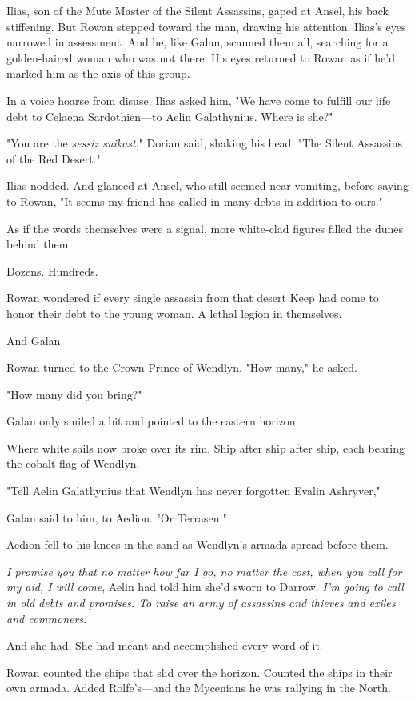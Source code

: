 Ilias, son of the Mute Master of the Silent Assassins, gaped at Ansel, his back stiffening.
But Rowan stepped toward the man, drawing his attention.
Ilias's eyes narrowed in assessment.
And he, like Galan, scanned them all, searching for a golden-haired woman who was not there.
His eyes returned to Rowan as if he'd marked him as the axis of this group.

In a voice hoarse from disuse, Ilias asked him, "We have come to fulfill our life debt to Celaena Sardothien---to Aelin Galathynius.
Where is she?"

"You are the \emph{sessiz suikast}," Dorian said, shaking his head.
"The Silent Assassins of the Red Desert."

Ilias nodded.
And glanced at Ansel, who still seemed near vomiting, before saying to Rowan, "It seems my friend has called in many debts in addition to ours."

As if the words themselves were a signal, more white-clad figures filled the dunes behind them.

Dozens.
Hundreds.

Rowan wondered if every single assassin from that desert Keep had come to honor their debt to the young woman.
A lethal legion in themselves.

And Galan 

Rowan turned to the Crown Prince of Wendlyn.
"How many," he asked.

"How many did you bring?"

Galan only smiled a bit and pointed to the eastern horizon.

Where white sails now broke over its rim.
Ship after ship after ship, each bearing the cobalt flag of Wendlyn.

"Tell Aelin Galathynius that Wendlyn has never forgotten Evalin Ashryver,"

Galan said to him, to Aedion.
"Or Terrasen."

Aedion fell to his knees in the sand as Wendlyn's armada spread before them.

\emph{I promise you that no matter how far I go, no matter the cost, when you call for my aid, I will come}, Aelin had told him she'd sworn to Darrow.
\emph{I'm going to call in old debts and promises.
To raise an army of assassins and thieves and exiles and commoners.}

And she had.
She had meant and accomplished every word of it.

Rowan counted the ships that slid over the horizon.
Counted the ships in their own armada.
Added Rolfe's---and the Mycenians he was rallying in the North.

